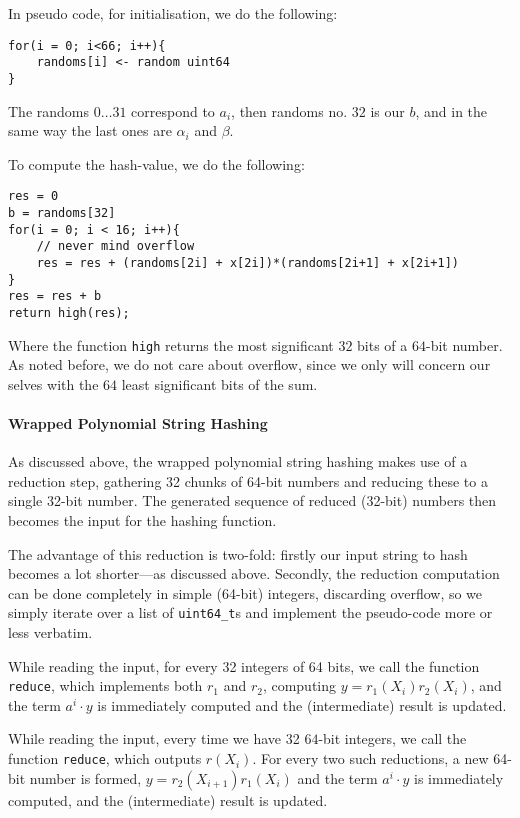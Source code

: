 \documentclass[]{article}
\newcommand{\funk}[1]{\texttt{\small #1}}
\begin{document}
In pseudo code, for initialisation, we do the following:

\begin{verbatim}
for(i = 0; i<66; i++){
    randoms[i] <- random uint64
}
\end{verbatim}

The randoms $0\ldots 31$ correspond to $a_i$, then randoms no. $32$ is our $b$, and in the same way the last ones are $\alpha_i$ and $\beta$.

To compute the hash-value, we do the following:
\begin{verbatim}
res = 0
b = randoms[32]
for(i = 0; i < 16; i++){
    // never mind overflow
    res = res + (randoms[2i] + x[2i])*(randoms[2i+1] + x[2i+1])
}
res = res + b
return high(res);
\end{verbatim}

Where the function \texttt{high} returns the most significant $32$ bits of a $64$-bit number.
As noted before, we do not care about overflow, since we only will concern our selves with the $64$ least significant bits of the sum.

\paragraph{Wrapped Polynomial String Hashing}

As discussed above, the wrapped polynomial string hashing makes use of a
reduction step, gathering 32 chunks of 64-bit numbers and reducing these to a
single 32-bit number. The generated sequence of reduced (32-bit) numbers then
becomes the input for the hashing function.

The advantage of this reduction is two-fold: firstly our input string to hash
becomes a lot shorter---as discussed above. Secondly, the reduction computation
can be done completely in simple (64-bit) integers, discarding overflow, so we
simply iterate over a list of \funk{uint64\_t}s and implement the pseudo-code more or less verbatim.

While reading the input, for every 32 integers of 64 bits, we call the function
\funk{reduce}, which implements both $r_1$ and $r_2$, computing $y =
r_1(X_i)r_2(X_i)$, and the term $a^i \cdot y$ is immediately computed and the (intermediate) result is updated.

While reading the input, every time we have 32 $64$-bit integers, we call the function \funk{reduce}, which outputs $r(X_i)$. For every two such reductions, a new 64-bit number is formed, $y = r_2(X_{i+1})r_1(X_i)$ and the term $a^i \cdot y$ is immediately computed, and the (intermediate) result is updated.
\end{document}
